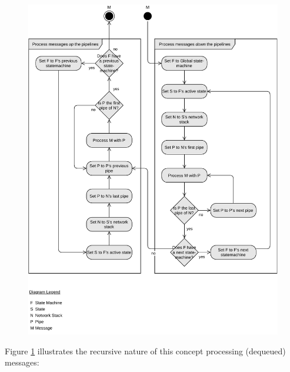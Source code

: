 \begin{figure}[h!]
    \centering
    \includegraphics[width=14cm]{img/ch05/activity-nested-fsms.pdf}
    \label{fig:activity-fsms}
\end{figure}
Figure \ref{fig:activity-fsms} illustrates the recursive nature of this concept processing (dequeued) messages:
